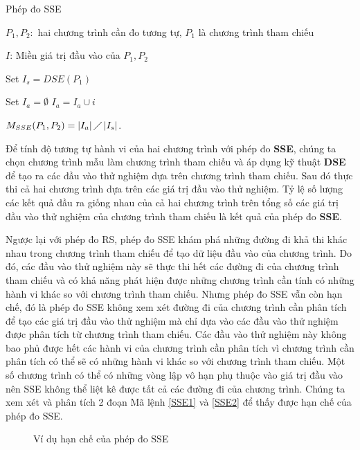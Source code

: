 \begin{algorithm}[h]
  \caption{Phép đo SSE}
  \label{alg:sse}
  \begin{algorithmic}
  \item $P_{1}, P_{2}:$ hai chương trình cần đo tương tự, $P_1$ là chương trình tham chiếu
  \item $I$: Miền giá trị đầu vào của $P_{1}, P_{2}$
  \item Set $I_{s} = DSE(P_{1})$ 
  \item Set $I_{a} = \emptyset$
     \State
    $I_{a} = I_{a} \cup i$
    \EndIf
    \EndFor
  \item
    $M_{SSE}(P_{1}, P_{2}) = \left|I_{a}\right| \diagup
    \left|I_{s}\right| $.
  \end{algorithmic}
\end{algorithm}

Để tính độ tương tự hành vi của hai chương trình với phép đo
\textbf{SSE}, chúng ta chọn chương trình mẫu làm chương trình tham
chiếu và áp dụng kỹ thuật \textbf{DSE} để tạo ra các đầu vào thử
nghiệm dựa trên chương trình tham chiếu. Sau đó thực thi cả hai chương
trình dựa trên các giá trị đầu vào thử nghiệm. Tỷ lệ số lượng các kết
quả đầu ra giống nhau của cả hai chương trình trên tổng số các giá trị
đầu vào thử nghiệm của chương trình tham chiếu là kết quả của phép đo
\textbf{SSE}.

Ngược lại với phép đo RS, phép đo SSE khám phá những đường đi khả thi
khác nhau trong chương trình tham chiếu để tạo dữ liệu đầu vào của
chương trình. Do đó, các đầu vào thử nghiệm này sẽ thực thi hết các
đường đi của chương trình tham chiếu và có khả năng phát hiện được
những chương trình cần tính có những hành vi khác so với chương trình
tham chiếu. Nhưng phép đo SSE vẫn còn hạn chế, đó là phép đo SSE không
xem xét đường đi của chương trình cần phân tích để tạo các giá trị đầu
vào thử nghiệm mà chỉ dựa vào các đầu vào thử nghiệm được phân tích từ
chương trình tham chiếu. Các đầu vào thử nghiệm này không bao phủ được
hết các hành vi của chương trình cần phân tích vì chương trình cần
phân tích có thể sẽ có những hành vi khác so với chương trình tham
chiếu. Một số chương trình có thể có những vòng lập vô hạn phụ thuộc
vào giá trị đầu vào nên SSE không thể liệt kê được tất cả các đường
đi của chương trình. Chúng ta xem xét và phân tích 2 đoạn Mã lệnh
\ref{SSE1} và \ref{SSE2} để thấy được hạn chế của phép đo SSE.
\begin{figure}[h]
	\centering
	\caption{Ví dụ hạn chế của phép đo SSE}
	\label{fig:hanche-SSE}
\begin{minipage}[t]{0.45\linewidth}
  
\end{minipage}%
\hfill\vrule\hfill
\begin{minipage}[t]{0.45\linewidth}
	
\end{minipage}%
\end{figure}

